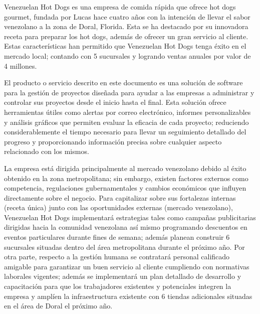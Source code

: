 
                Venezuelan Hot Dogs es una empresa de comida rápida que ofrece hot dogs gourmet, fundada por Lucas hace cuatro años con la intención de llevar el sabor venezolano a la zona de Doral, Florida. Esta se ha destacado por su innovadora receta para preparar los hot dogs, además de ofrecer un gran servicio al cliente. Estas características han permitido que Venezuelan Hot Dogs tenga éxito en el mercado local; contando con 5 sucursales y logrando ventas anuales por valor de 4 millones.

                El producto o servicio descrito en este documento es una solución de software para la gestión de proyectos diseñada para ayudar a las empresas a administrar y controlar sus proyectos desde el inicio hasta el final. Esta solución ofrece herramientas útiles como alertas por correo electrónico, informes personalizables y análisis gráficos que permiten evaluar la eficacia de cada proyecto; reduciendo considerablemente el tiempo necesario para llevar un seguimiento detallado del progreso y proporcionando información precisa sobre cualquier aspecto relacionado con los mismos.

                La empresa está dirigida principalmente al mercado venezolano debido al éxito obtenido en la zona metropolitana; sin embargo, existen factores externos como competencia, regulaciones gubernamentales y cambios económicos que influyen directamente sobre el negocio. Para capitalizar sobre sus fortalezas internas (receta única) junto con las oportunidades externas (mercado venezolano), Venezuelan Hot Dogs implementará estrategias tales como campañas publicitarias dirigidas hacia la comunidad venezolana así mismo programando descuentos en eventos particulares durante fines de semana; además planean construir 6 sucursales situadas dentro del área metropolitana durante el próximo año. Por otra parte, respecto a la gestión humana se contratará personal calificado amigable para garantizar un buen servicio al cliente cumpliendo con normativas laborales vigentes; además se implementará un plan detallado de desarrollo y capacitación para que los trabajadores existentes y potenciales integren la empresa y amplíen la infraestructura existente con 6 tiendas adicionales situadas en el área de Doral el próximo año.
